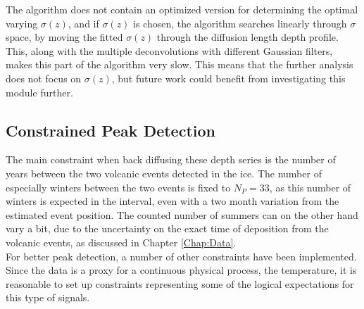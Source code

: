 \documentclass[../../CompleteThesis2/Complete_2ndDraft]{subfiles}
\begin{document}
%		
%		
%		

The algorithm does not contain an optimized version for determining the optimal varying $\sigma(z)$, and if $\sigma(z)$ is chosen, the algorithm searches linearly through $\sigma$ space, by moving the fitted $\sigma(z)$ through the diffusion length depth profile. This, along with the multiple deconvolutions with different Gaussian filters, makes this part of the algorithm very slow. This means that the further analysis does not focus on $\sigma(z)$, but future work could benefit from investigating this module further.

\subsection[Constrained Peak Detection]{Constrained Peak Detection}
\label{Subsec:Meth_PeakDetection_Constrained}
The main constraint when back diffusing these depth series is the number of years between the two volcanic events detected in the ice. The number of especially winters between the two events is fixed to $N_P=33$, as this number of winters is expected in the interval, even with a two month variation from the estimated event position. The counted number of summers can on the other hand vary a bit, due to the uncertainty on the exact time of deposition from the volcanic events, as discussed in Chapter \ref{Chap:Data}.\\
For better peak detection, a number of other constraints have been implemented. Since the data is a proxy for a continuous physical process, the temperature, it is reasonable to set up constraints representing some of the logical expectations for this type of signals. 
\end{document}
